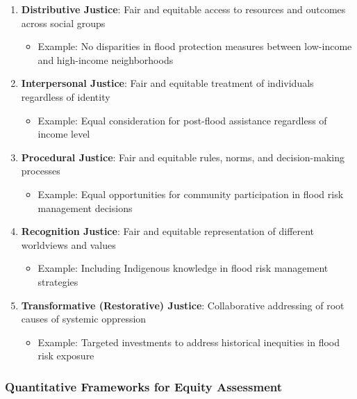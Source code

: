 \documentclass[
  letterpaper,
  DIV=11,
  numbers=noendperiod]{scrreprt}
\providecommand{\tightlist}{%
  \setlength{\itemsep}{0pt}\setlength{\parskip}{0pt}}
\begin{document}
\begin{enumerate}
\def\labelenumi{\arabic{enumi}.}
\tightlist
\item
  \textbf{Distributive Justice}: Fair and equitable access to resources
  and outcomes across social groups

  \begin{itemize}
  \tightlist
  \item
    Example: No disparities in flood protection measures between
    low-income and high-income neighborhoods
  \end{itemize}
\item
  \textbf{Interpersonal Justice}: Fair and equitable treatment of
  individuals regardless of identity

  \begin{itemize}
  \tightlist
  \item
    Example: Equal consideration for post-flood assistance regardless of
    income level
  \end{itemize}
\item
  \textbf{Procedural Justice}: Fair and equitable rules, norms, and
  decision-making processes

  \begin{itemize}
  \tightlist
  \item
    Example: Equal opportunities for community participation in flood
    risk management decisions
  \end{itemize}
\item
  \textbf{Recognition Justice}: Fair and equitable representation of
  different worldviews and values

  \begin{itemize}
  \tightlist
  \item
    Example: Including Indigenous knowledge in flood risk management
    strategies
  \end{itemize}
\item
  \textbf{Transformative (Restorative) Justice}: Collaborative
  addressing of root causes of systemic oppression

  \begin{itemize}
  \tightlist
  \item
    Example: Targeted investments to address historical inequities in
    flood risk exposure
  \end{itemize}
\end{enumerate}

\subsubsection{Quantitative Frameworks for Equity
Assessment}\label{quantitative-frameworks-for-equity-assessment}
\end{document}
